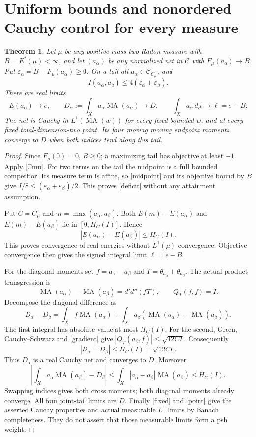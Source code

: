 \documentclass[11pt]{article}
\newtheorem{theorem}{Theorem}
\newcommand{\C}{\mathcal C}
\newcommand{\MA}{\operatorname{MA}}
\newcommand{\DD}{d'd''}
\begin{document}
\section{Uniform bounds and nonordered Cauchy control for every measure}
\begin{theorem}\label{universal}
Let $\mu$ be any positive mass-two Radon measure with
$B=E^*(\mu)<\infty$, and let $(a_\alpha)$ be any normalized net
in $\C$ with $F_\mu(a_\alpha)\to B$. Put
$\varepsilon_\alpha=B-F_\mu(a_\alpha)\ge0$.
On a tail all $a_\alpha\in\C_{C_\mu}$, and
\begin{equation}\label{deficit}
 I(a_\alpha,a_\beta)\le
             4(\varepsilon_\alpha+\varepsilon_\beta).
\end{equation}
There are real limits
\[
 E(a_\alpha)\to e,\qquad
 D_\alpha:=\int_X a_\alpha\MA(a_\alpha)\to D,
 \qquad \int_Xa_\alpha\,d\mu\to\ell=e-B.
\]
The net is Cauchy in $L^1(\MA(w))$ for every fixed bounded $w$,
and at every fixed total-dimension-two point. Its four moving
moving endpoint moments converge to $D$ when both indices tend
along this tail.
\end{theorem}
\begin{proof}
Since $F_\mu(0)=0$, $B\ge0$; a maximizing tail has objective
at least $-1$. Apply \eqref{Cmu}. For two terms on the tail the
midpoint is a full bounded competitor. Its measure term is affine,
so \eqref{midpoint} and its objective bound by $B$ give
$I/8\le(\varepsilon_\alpha+\varepsilon_\beta)/2$.
This proves \eqref{deficit} without any attainment assumption.

Put $C=C_\mu$ and $m=\max(a_\alpha,a_\beta)$.
Both $E(m)-E(a_\alpha)$ and $E(m)-E(a_\beta)$ lie in
$[0,H_C(I)]$. Hence
\begin{equation}\label{energycauchy}
 |E(a_\alpha)-E(a_\beta)|\le H_C(I).
\end{equation}
This proves convergence of real energies without $L^1(\mu)$
convergence. Objective convergence then gives the signed integral
limit $\ell=e-B$.

For the diagonal moments set $f=a_\alpha-a_\beta$ and
$T=\theta_{a_\alpha}+\theta_{a_\beta}$.
The actual product transgression is
\[
 \MA(a_\alpha)-\MA(a_\beta)=\DD(fT),
 \qquad Q_T(f,f)=I.
\]
Decompose the diagonal difference as
\[
 D_\alpha-D_\beta=
 \int_X f\MA(a_\alpha)+
 \int_Xa_\beta(\MA(a_\alpha)-\MA(a_\beta)).
\]
The first integral has absolute value at most $H_C(I)$.
For the second, Green, Cauchy--Schwarz and \eqref{gradient}
give $|Q_T(a_\beta,f)|\le\sqrt{12CI}$.
Consequently
\begin{equation}\label{diagonalcauchy}
 |D_\alpha-D_\beta|\le H_C(I)+\sqrt{12CI}.
\end{equation}
Thus $D_\alpha$ is a real Cauchy net and converges to $D$.
Moreover
\[
 \left|\int_Xa_\alpha\MA(a_\beta)-D_\beta\right|
 \le\int_X|a_\alpha-a_\beta|\MA(a_\beta)\le H_C(I).
\]
Swapping indices gives both cross moments; both diagonal moments
already converge. All four joint-tail limits are $D$.
Finally \eqref{fixed} and \eqref{point} give the asserted Cauchy
properties and actual measurable $L^1$ limits by Banach completeness.
They do not assert that those measurable limits form a psh weight.
\end{proof}
\end{document}
